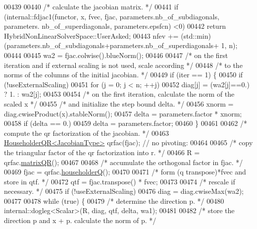 \begin{DoxyCode}
00439 
00440     \textcolor{comment}{/* calculate the jacobian matrix. */}
00441     \textcolor{keywordflow}{if} (internal::fdjac1(functor, x, fvec, fjac, parameters.nb\_of\_subdiagonals, parameters.
      nb\_of\_superdiagonals, parameters.epsfcn) <0)
00442         \textcolor{keywordflow}{return} HybridNonLinearSolverSpace::UserAsked;
00443     nfev += (std::min)(parameters.nb\_of\_subdiagonals+parameters.nb\_of\_superdiagonals+ 1, n);
00444 
00445     wa2 = fjac.colwise().blueNorm();
00446 
00447     \textcolor{comment}{/* on the first iteration and if external scaling is not used, scale according */}
00448     \textcolor{comment}{/* to the norms of the columns of the initial jacobian. */}
00449     \textcolor{keywordflow}{if} (iter == 1) \{
00450         \textcolor{keywordflow}{if} (!useExternalScaling)
00451             \textcolor{keywordflow}{for} (j = 0; j < n; ++j)
00452                 diag[j] = (wa2[j]==0.) ? 1. : wa2[j];
00453 
00454         \textcolor{comment}{/* on the first iteration, calculate the norm of the scaled x */}
00455         \textcolor{comment}{/* and initialize the step bound delta. */}
00456         xnorm = diag.cwiseProduct(x).stableNorm();
00457         delta = parameters.factor * xnorm;
00458         \textcolor{keywordflow}{if} (delta == 0.)
00459             delta = parameters.factor;
00460     \}
00461 
00462     \textcolor{comment}{/* compute the qr factorization of the jacobian. */}
00463     \hyperlink{group___q_r___module_class_eigen_1_1_householder_q_r}{HouseholderQR<JacobianType>} qrfac(fjac); \textcolor{comment}{// no pivoting:}
00464 
00465     \textcolor{comment}{/* copy the triangular factor of the qr factorization into r. */}
00466     R = qrfac.\hyperlink{group___q_r___module_ae837f2fb30099212c53b3042c7d699c9}{matrixQR}();
00467 
00468     \textcolor{comment}{/* accumulate the orthogonal factor in fjac. */}
00469     fjac = qrfac.\hyperlink{group___q_r___module_affd506c10ef2d25f56e7b1f9f25ff885}{householderQ}();
00470 
00471     \textcolor{comment}{/* form (q transpose)*fvec and store in qtf. */}
00472     qtf = fjac.transpose() * fvec;
00473 
00474     \textcolor{comment}{/* rescale if necessary. */}
00475     \textcolor{keywordflow}{if} (!useExternalScaling)
00476         diag = diag.cwiseMax(wa2);
00477 
00478     \textcolor{keywordflow}{while} (\textcolor{keyword}{true}) \{
00479         \textcolor{comment}{/* determine the direction p. */}
00480         internal::dogleg<Scalar>(R, diag, qtf, delta, wa1);
00481 
00482         \textcolor{comment}{/* store the direction p and x + p. calculate the norm of p. */}

\end{DoxyCode}
